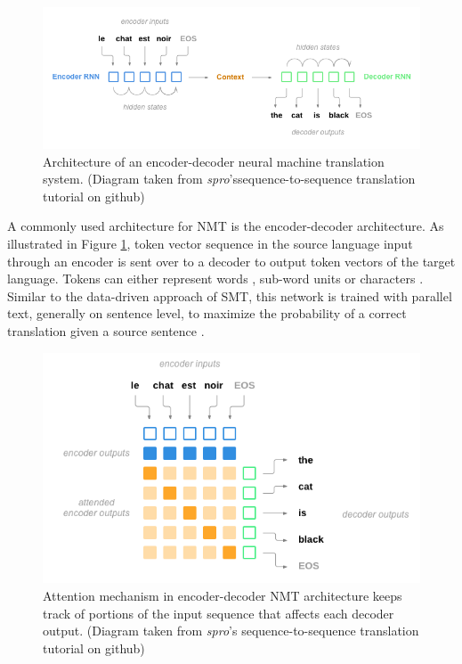 
\begin{figure}[t]
  \centering
  \includegraphics[width=\linewidth]{img/spro_nmt.png}
  \caption[Architecture of an encoder-decoder neural machine translation system.]{Architecture of an encoder-decoder neural machine translation system. (Diagram taken from \textit{spro}'s\protect\footnotemark sequence-to-sequence translation tutorial on github)}
  \label{sota:nmt_schema}
\end{figure}


A commonly used architecture for NMT is the encoder-decoder architecture. As illustrated in Figure \ref{sota:nmt_schema}, token vector sequence in the source language input through an encoder is sent over to a decoder to output token vectors of the target language. Tokens can either represent words \citep{sutskever}, sub-word units \citep{google_nmt} or characters \citep{Ling2015CharacterbasedNM, marta}. Similar to the data-driven approach of SMT, this network is trained with parallel text, generally on sentence level, to maximize the probability of a correct translation given a source sentence \citep{bahdanau}.

\begin{figure}[t]
  \centering
  \includegraphics[width=0.8\linewidth]{img/spro_nmt_attention.png}
  \caption[Attention mechanism in encoder-decoder NMT architecture.]{Attention mechanism in encoder-decoder NMT architecture keeps track of portions of the input sequence that affects each decoder output. (Diagram taken from \textit{spro}'s sequence-to-sequence translation tutorial on github)}
  \label{sota:nmt_attention}
\end{figure}

